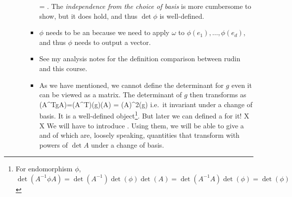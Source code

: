 \documentclass{article}
\newcommand\Ccancel[2][black]{\renewcommand\CancelColor{\color{#1}}\cancel{#2}}
\begin{document}
\begin{enumerate}
\begin{itemize}
\begin{itemize}[$\ast$]
\bse
  =  \frac{\Ccancel[gray]{c}\,\omega'(\phi(e_1),\ldots,\phi(e_d))}{\Ccancel[gray]{c}\,\omega'(e_1,\ldots,e_d)}.
\ese
The \emph{independence from the choice of basis} is more cumbersome to show, but it does hold, and thus $\det \phi$ is well-defined.
\item $\phi$ needs to be an  because we need to apply $\omega$ to $\phi(e_1),\ldots,\phi(e_d)$, and thus $\phi$ needs to output a vector.
\item See my analysis notes for the definition comparison between rudin and this course.
\item As we have mentioned, we cannot define the determinant for $g$ even it can be viewed as a matrix. The determinant of $g$ then transforms as
\bse
\det(A^TgA)=\det(A^T)\det(g)\det(A) = (\det A)^2\det(g)
\ese
i.e.\ it  invariant under a change of basis. It is  a well-defined object\footnote{For endomorphism $\phi$, $\det(A^{-1}\phi A)=\det(A^{-1})\det(\phi)\det(A)=\det(A^{-1}A)\det(\phi) = \det(\phi)$}.
But later we can defined a  for it! 
\bse
X \to {} \, X
\ese
 {\tiny We will have to introduce . Using them, we will be able to give a  and of  which are, loosely speaking, quantities that transform with powers of $\det A$ under a change of basis.}
\end{itemize}
\end{itemize}


\end{enumerate}
\end{document}

